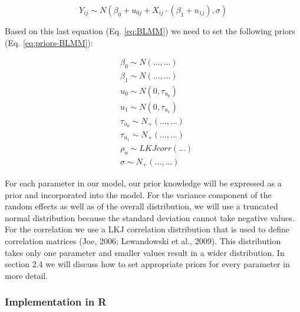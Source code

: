 \documentclass[
  doc,12pt,floatsintext]{apa7}
\begin{document}
\begin{equation}
Y_{ij} \sim N(\beta_{0} + u_{0j} + X_{ij} \cdot (\beta_{1} + u_{1j}), \sigma)
\label{eq:BLMM}
\end{equation}

Based on this last equation (Eq. \eqref{eq:BLMM}) we need to set the following priors (Eq. \eqref{eq:priors-BLMM}):

\begin{equation}
\begin{split}
& \beta_{0} \sim N(...,...) \\
& \beta_{1} \sim N(...,...) \\
& u_0 \sim N(0,\tau_{u_0}) \\
& u_1 \sim N(0,\tau_{u_1}) \\
& \tau_{u_0} \sim N_+(...,...) \\
& \tau_{u_1} \sim N_+(...,...) \\
& \rho_u \sim LKJcorr(...) \\
& \sigma \sim N_+(...,...)
\end{split}
\label{eq:priors-BLMM}
\end{equation}

For each parameter in our model, our prior knowledge will be expressed as a prior and incorporated into the model. For the variance component of the random effects as well as of the overall distribution, we will use a truncated normal distribution because the standard deviation cannot take negative values. For the correlation we use a LKJ correlation distribution that is used to define correlation matrices (Joe, 2006; Lewandowski et al., 2009). This distribution takes only one parameter and smaller values result in a wider distribution. In section 2.4 we will discuss how to set appropriate priors for every parameter in more detail.

\subsubsection{Implementation in R}\label{implementation-in-r}
\end{document}
